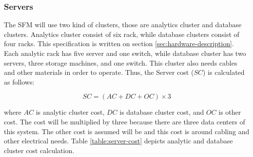 \subsubsection{Servers}
The \gls{SFM} will use two kind of clusters, those are analytics cluster and database clusters. Analytics cluster consist of six rack, while database clusters consist of four racks. This specification is written on section \ref{sec:hardware-description}. Each analytic rack has five server and one switch, while database cluster has two servers, three storage machines, and one switch. This cluster also needs cables and other materials in order to operate. Thus, the Server cost ($SC$) is calculated as follows:

\begin{equation*}
SC = (AC + DC + OC) \times 3
\end{equation*}

where $AC$ is analytic cluster cost, $DC$ is database cluster cost, and $OC$ is other cost. The cost will be multiplied by three because there are three data centers of this system. The other cost is assumed will be  and this cost is around cabling and other electrical needs. Table \ref{table:server-cost} depicts analytic and database cluster cost calculation.

